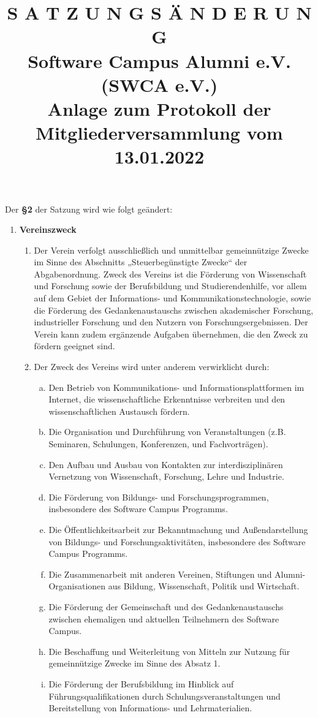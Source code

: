 \documentclass{article}
\title{\textsf{\textbf{S A T Z U N G S Ä N D E R U N G}}\\
\small\textbf{Software Campus Alumni e.V. (SWCA e.V.)}\\
Anlage zum Protokoll der Mitgliederversammlung vom 13.01.2022}
\author{}
\date{}
\begin{document}
\maketitle

Der \textbf{§2} der Satzung wird wie folgt geändert:

\begin{enumerate}[§ 2.]
\item \textsf{\textbf{Vereinszweck}}

\begin{enumerate}[1.]
	\item Der Verein verfolgt ausschließlich und unmittelbar gemeinnützige Zwecke im Sinne des Abschnitts „Steuerbegünstigte Zwecke“ der Abgabenordnung.
	Zweck des Vereins ist die Förderung von Wissenschaft und Forschung sowie der Berufsbildung und Studierendenhilfe, vor allem auf dem Gebiet der Informations- und Kommunikationstechnologie, sowie die Förderung des Gedankenaustauschs zwischen akademischer Forschung, industrieller Forschung und den Nutzern von Forschungsergebnissen.
	Der Verein kann zudem ergänzende Aufgaben übernehmen, die den Zweck zu fördern geeignet sind.

	\item Der Zweck des Vereins wird unter anderem verwirklicht durch:
		\begin{enumerate}[a.]
		\item Den Betrieb von Kommunikations- und Informationsplattformen im Internet,
			die wissenschaftliche Erkenntnisse verbreiten und den wissenschaftlichen Austausch fördern.
		\item Die Organisation und Durchführung von Veranstaltungen
			(z.B. Seminaren, Schulungen, Konferenzen, und Fachvorträgen).
		\item Den Aufbau und Ausbau von Kontakten zur interdisziplinären Vernetzung von Wissenschaft, Forschung, Lehre und Industrie.
		\item Die Förderung von Bildungs- und Forschungsprogrammen, insbesondere des Software Campus Programms.
		\item Die Öffentlichkeitsarbeit zur Bekanntmachung und Außendarstellung von
			Bildungs- und Forschungsaktivitäten, insbesondere des Software Campus Programms.
		\item Die Zusammenarbeit mit anderen Vereinen, Stiftungen und Alumni-Organisationen
			aus Bildung, Wissenschaft, Politik und Wirtschaft.
		\item Die Förderung der Gemeinschaft und des Gedankenaustauschs zwischen ehemaligen und aktuellen Teilnehmern des Software Campus.
		\item Die Beschaffung und Weiterleitung von Mitteln zur Nutzung für gemeinnützige Zwecke im Sinne des Absatz 1.
		\item Die Förderung der Berufsbildung im Hinblick auf Führungsqualifikationen durch Schulungsveranstaltungen
			und Bereitstellung von Informations- und Lehrmaterialien.
		\end{enumerate}
	\end{enumerate}
\end{enumerate}
\end{document}
